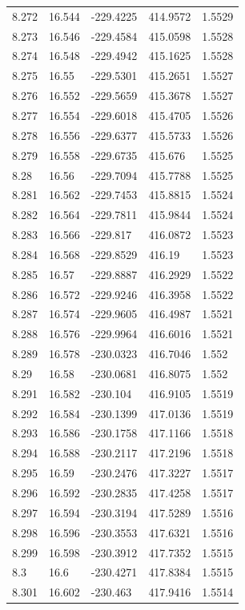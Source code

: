 \begin{tabular}{lllll}
8.272 & 16.544 & -229.4225 & 414.9572 & 1.5529 \\
8.273 & 16.546 & -229.4584 & 415.0598 & 1.5528 \\
8.274 & 16.548 & -229.4942 & 415.1625 & 1.5528 \\
8.275 & 16.55 & -229.5301 & 415.2651 & 1.5527 \\
8.276 & 16.552 & -229.5659 & 415.3678 & 1.5527 \\
8.277 & 16.554 & -229.6018 & 415.4705 & 1.5526 \\
8.278 & 16.556 & -229.6377 & 415.5733 & 1.5526 \\
8.279 & 16.558 & -229.6735 & 415.676 & 1.5525 \\
8.28 & 16.56 & -229.7094 & 415.7788 & 1.5525 \\
8.281 & 16.562 & -229.7453 & 415.8815 & 1.5524 \\
8.282 & 16.564 & -229.7811 & 415.9844 & 1.5524 \\
8.283 & 16.566 & -229.817 & 416.0872 & 1.5523 \\
8.284 & 16.568 & -229.8529 & 416.19 & 1.5523 \\
8.285 & 16.57 & -229.8887 & 416.2929 & 1.5522 \\
8.286 & 16.572 & -229.9246 & 416.3958 & 1.5522 \\
8.287 & 16.574 & -229.9605 & 416.4987 & 1.5521 \\
8.288 & 16.576 & -229.9964 & 416.6016 & 1.5521 \\
8.289 & 16.578 & -230.0323 & 416.7046 & 1.552 \\
8.29 & 16.58 & -230.0681 & 416.8075 & 1.552 \\
8.291 & 16.582 & -230.104 & 416.9105 & 1.5519 \\
8.292 & 16.584 & -230.1399 & 417.0136 & 1.5519 \\
8.293 & 16.586 & -230.1758 & 417.1166 & 1.5518 \\
8.294 & 16.588 & -230.2117 & 417.2196 & 1.5518 \\
8.295 & 16.59 & -230.2476 & 417.3227 & 1.5517 \\
8.296 & 16.592 & -230.2835 & 417.4258 & 1.5517 \\
8.297 & 16.594 & -230.3194 & 417.5289 & 1.5516 \\
8.298 & 16.596 & -230.3553 & 417.6321 & 1.5516 \\
8.299 & 16.598 & -230.3912 & 417.7352 & 1.5515 \\
8.3 & 16.6 & -230.4271 & 417.8384 & 1.5515 \\
8.301 & 16.602 & -230.463 & 417.9416 & 1.5514 \\

\end{tabular}
